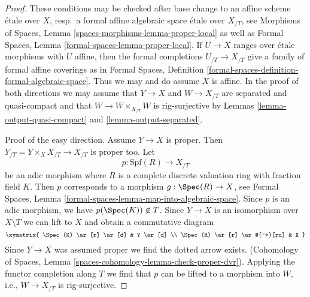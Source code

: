 \begin{proof}
These conditions may be checked after base change to an affine
scheme \'etale over $X$, resp.\ a formal affine algebraic space
\'etale over $X_{/T}$, see
Morphisms of Spaces, Lemma \ref{spaces-morphisms-lemma-proper-local}
as well as
Formal Spaces, Lemma \ref{formal-spaces-lemma-proper-local}.
If $U \to X$ ranges over \'etale morphisms with $U$ affine, then
the formal completions $U_{/T} \to X_{/T}$ give a family
of formal affine coverings as in Formal Spaces, Definition
\ref{formal-spaces-definition-formal-algebraic-space}.
Thus we may and do assume $X$ is affine.
In the proof of both directions we may assume that $Y \to X$
and $W \to X_{/T}$ are separated and quasi-compact and that
$W \to W \times_{X_{/T}} W$ is rig-surjective by
Lemmas \ref{lemma-output-quasi-compact} and \ref{lemma-output-separated}.

\medskip\noindent
Proof of the easy direction. Assume $Y \to X$ is proper.
Then $Y_{/T} = Y \times_X X_{/T} \to X_{/T}$ is proper too.
Let
$$
p : \text{Spf}(R) \longrightarrow X_{/T}
$$
be an adic morphism where $R$ is a complete discrete valuation ring with
fraction field $K$. Then $p$ corresponds to a morphism $g : \Spec(R) \to X$,
see
Formal Spaces, Lemma \ref{formal-spaces-lemma-map-into-algebraic-space}.
Since $p$ is an adic morphism, we have $p(\Spec(K)) \not \in T$.
Since $Y \to X$ is an isomorphism over $X \setminus T$ we can lift
to $X$ and obtain a commutative diagram
$$
\xymatrix{
\Spec(K) \ar[r] \ar[d] & Y \ar[d] \\
\Spec(R) \ar[r] \ar@{-->}[ru] & X
}
$$
Since $Y \to X$ was assumed proper we find the dotted arrow exists.
(Cohomology of Spaces, Lemma
\ref{spaces-cohomology-lemma-check-proper-dvr}).
Applying the functor completion along $T$ we find that $p$ can be
lifted to a morphism into $W$, i.e., $W \to X_{/T}$ is
rig-surjective.


\end{proof}
